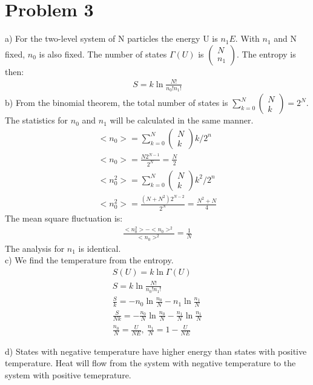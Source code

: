 \documentclass[a4paper,12pt]{article}
\numberwithin{equation}{section}
\begin{document}
\section{Problem 3}
a) For the two-level system of N particles the energy U is $n_1E$. 
With $n_1$ and N fixed, $n_0$ is also fixed.
The number of states $\Gamma(U)$ is $\left(\substack{N\\n_1}\right)$.
The entropy is then:
\begin{gather}
 S=k\ln{\frac{N!}{n_0!n_1!}}
\end{gather}
b) From the binomial theorem, the total number of states is $\sum_{k=0}^N \left(\substack{N\\k}\right)=2^N$.
The statistics for $n_0$ and $n_1$ will be calculated in the same manner.
\begin{gather}
 <n_0>=\sum_{k=0}^N \left(\substack{N\\k}\right)k / 2^n\\
 <n_0>=\frac{N2^{N-1}}{2^N}=\frac{N}{2}\\
 <n_0^2>=\sum_{k=0}^N \left(\substack{N\\k}\right)k^2 / 2^n\\
 <n_0^2>=\frac{(N+N^2)2^{N-2}}{2^N}=\frac{N^2+N}{4}
\end{gather}
The mean square fluctuation is:
\begin{gather}
 \frac{<n_0^2>-<n_0>^2}{<n_0>^2}=\frac{1}{N}
\end{gather}
The analysis for $n_1$ is identical.
\\
c) We find the temperature from the entropy.
\begin{gather}
 S(U)=k\ln{\Gamma(U)}\\
 S=k\ln{\frac{N!}{n_0!n_1!}}\\
 \frac{S}{k}=-n_0\ln{\frac{n_0}{N}}-n_1\ln{\frac{n_1}{N}}\\
 \frac{S}{Nk}=-\frac{n_0}{N}\ln{\frac{n_0}{N}}-\frac{n_1}{N}\ln{\frac{n_1}{N}}\\
 \frac{n_0}{N}=\frac{U}{NE},\ \frac{n_1}{N}=1-\frac{U}{NE}
\end{gather}

d) States with negative temperature have higher energy than states with positive temperature. 
Heat will flow from the system with negative temperature to the system with positive temeprature.
\end{document}
